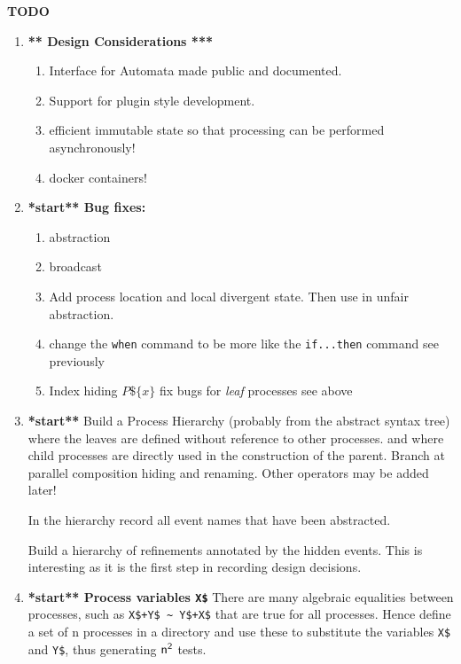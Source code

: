 \documentclass[]{article}
\begin{document}
\begin{center}{\bf \Huge  TODO }\end{center}
\begin{enumerate}
\item {\bf *** Design Considerations ***}

\begin{enumerate}
\item Interface for Automata  made public and documented.
\item Support for plugin style development.
\item efficient immutable state so that processing can be performed asynchronously!
\item docker containers!
\end{enumerate}

\item {\bf **start** Bug fixes:}
\begin{enumerate}
\item abstraction
\item broadcast
\item Add process location and local divergent state.  Then  use in unfair abstraction.
\item change  the \verb|when| command to be more like the \verb|if...then| command see previously
\item Index hiding   $P\$\{x\}$ fix bugs for \emph{leaf} processes see above


\end{enumerate}



\item {\bf **start**}  Build a  {\sf Process Hierarchy} (probably from the abstract syntax tree) where the leaves are defined without reference to other processes. and where child processes are directly used in the construction of the parent. Branch at parallel composition hiding and renaming. Other operators may be added later!

In the hierarchy record all event names that have been abstracted.

Build a hierarchy of refinements annotated by the hidden events. This is interesting as it is the first step in recording  design decisions.

\item {\bf  **start** Process variables \verb|X$|} There are many algebraic equalities between processes, such as  \verb|X$+Y$ ~ Y$+X$| that are true for all processes. Hence define a set of {\sf n} processes in a directory and use these to substitute the variables \verb|X$| and \verb|Y$|, thus generating   ${\sf n^2}$ tests.


\end{enumerate}
\end{document}
